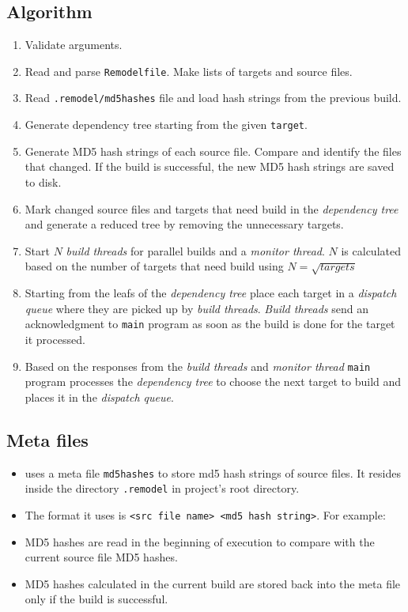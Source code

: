 \documentclass[12pt,letterpaper,titlepage, one-sided]{article}
\begin{document}
	\subsection{Algorithm}
		\begin{enumerate}
		\item
		Validate arguments.
		\item
		Read and parse \texttt{Remodelfile}. Make lists of targets and source files.
		\item
		Read \texttt{.remodel/md5hashes} file and load hash strings from the previous build.
		\item
		Generate dependency tree starting from the given \texttt{target}.
		\item
		Generate MD5 hash strings of each source file. Compare and identify the files that changed. If the build is successful, the new MD5 hash strings are saved to disk.
		\item
		Mark changed source files and targets that need build in the \textit{dependency tree} and generate a reduced tree by removing the unnecessary targets.
		\item
		Start $N$ \textit{build threads} for parallel builds and a \textit{monitor thread}. $N$ is calculated based on the number of targets that need build using $N = \sqrt{targets}$
		\item
		Starting from the leafs of the \textit{dependency tree} place each target in a \textit{dispatch queue} where they are picked up by \textit{build threads}. \textit{Build threads} send an acknowledgment to \texttt{main} program as soon as the build is done for the target it processed.
		\item
		Based on the responses from the \textit{build threads} and \textit{monitor thread} \texttt{main} program processes the \textit{dependency tree} to choose the next target to build and places it in the \textit{dispatch queue}.
		\end{enumerate}
		\subsection{Meta files}
		\begin{itemize}
		\item
		\remodel uses a meta file \texttt{md5hashes} to store md5 hash strings of source files. It resides inside the directory \texttt{.remodel} in project's root directory.
		\item
		The format it uses is \texttt{<src file name> <md5 hash string>}. For example: 
		
		\item
		MD5 hashes are read in the beginning of \remodel execution to compare with the current source file MD5 hashes.
		\item
		MD5 hashes calculated in the current build are stored back into the meta file only if the build is successful.
		
		\end{itemize}
\end{document}
